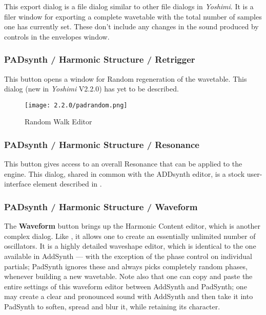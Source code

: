    This export dialog is a file dialog similar to other file dialogs
   in \textsl{Yoshimi}.
   It is a filer window for exporting a complete wavetable with the total number
   of samples one has currently set. These don't include any changes in the sound
   produced by controls in the envelopes window.

\subsubsection{PADsynth / Harmonic Structure / Retrigger}
\label{subsubsec:padsynth_harmonic_structure_retrigger}
   This button opens a window for Random regeneration of the wavetable.
   This dialog (new in \textsl{Yoshimi} V2.2.0) has yet to be described.

\begin{figure}[H]
   \centering
   \texttt{[image: 2.2.0/padrandom.png]}
   \caption{Random Walk Editor}
   \label{fig:padsynth_random_walk_editor}
\end{figure}

\subsubsection{PADsynth / Harmonic Structure / Resonance}
\label{subsubsec:padsynth_harmonic_structure_resonance}

   This button gives access to an overall Resonance that can be applied to the
   engine.  This dialog, shared in common with the ADDsynth editor, is a stock
   user-interface element described in
   .

\subsubsection{PADsynth / Harmonic Structure / Waveform}
\label{subsubsec:padsynth_harmonic_structure_change}

   The \textbf{Waveform} button brings up the
   Harmonic Content editor, which is another complex dialog.
   Like ,
   it allows one to create an essentially unlimited number of oscillators.
   It is a highly detailed waveshape editor, which is identical to the one
   available in AddSynth — with the exception of the phase control on individual
   partials; PadSynth ignores these and always picks completely random phases,
   whenever building a new wavetable. Note also that one can copy and paste the
   entire settings of this waveform editor between AddSynth and PadSynth; one may
   create a clear and pronounced sound with AddSynth and then take it into
   PadSynth to soften, spread and blur it, while retaining its character.

